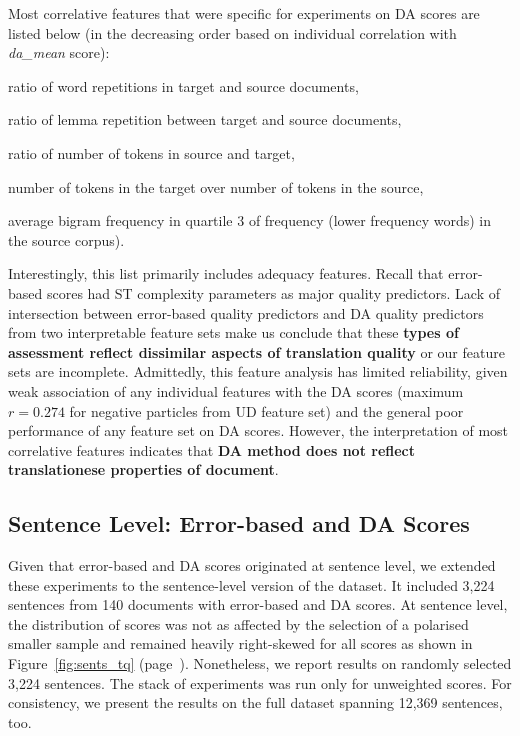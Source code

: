 Most correlative features that were specific for experiments on DA scores are listed below (in the decreasing order based on individual correlation with \textit{da\_mean} score): 
\begin{description}\compresslist{}
	\item[9992] ratio of word repetitions in target and source documents,
	\item[9993] ratio of lemma repetition between target and source documents,
	\item[1003] ratio of number of tokens in source and target,
	\item[1004] number of tokens in the target over number of tokens in the source,
	\item[1052] average bigram frequency in quartile 3 of frequency (lower frequency words) in the source corpus).
\end{description}

Interestingly, this list primarily includes adequacy features. Recall that error-based scores had ST complexity parameters as major quality predictors. 
Lack of intersection between error-based quality predictors and DA quality predictors from two interpretable feature sets make us conclude that these \textbf{types of assessment reflect dissimilar aspects of translation quality} or our feature sets are incomplete. 
Admittedly, this feature analysis has limited reliability, given weak association of any individual features with the DA scores (maximum $r=0.274$ for negative particles from UD feature set) and the general poor performance of any feature set on DA scores. 
However, the interpretation of most correlative features indicates that \textbf{DA method does not reflect translationese properties of document}.

\subsection{\label{ssec:sent_level}Sentence Level: Error-based and DA Scores}
Given that error-based and DA scores originated at sentence level, we extended these experiments to the sentence-level version of the dataset. It included 3,224 sentences from 140 documents with error-based and DA scores. At sentence level, the distribution of scores was not as affected by the selection of a polarised smaller sample and remained heavily right-skewed for all scores as shown in Figure~\ref{fig:sents_tq} (page~\pageref{fig:sents_tq}). Nonetheless, we report results on randomly selected 3,224 sentences. The stack of experiments was run only for unweighted scores. For consistency, we present the results on the full dataset spanning 12,369 sentences, too.

